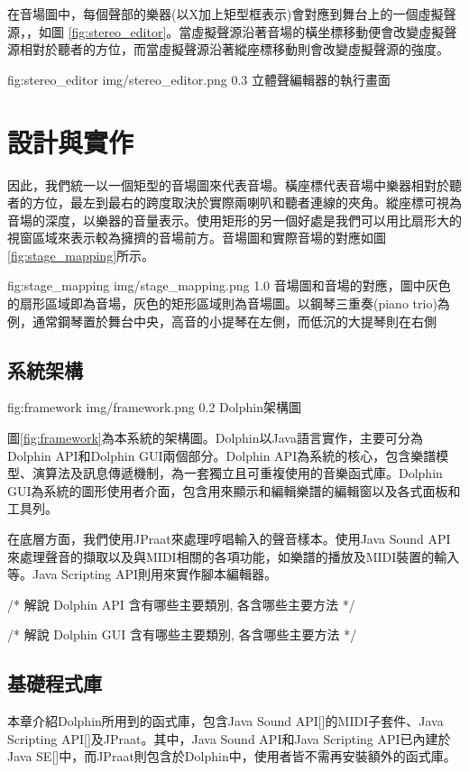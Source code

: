 \documentclass[12pt,a4paper,oneside]{report}
\begin{document}
在音場圖中，每個聲部的樂器(以X加上矩型框表示)會對應到舞台上的一個虛擬聲源，，如圖 \ref{fig:stereo_editor}。當虛擬聲源沿著音場的橫坐標移動便會改變虛擬聲源相對於聽者的方位，而當虛擬聲源沿著縱座標移動則會改變虛擬聲源的強度。

\figurewithcaption
{fig:stereo_editor}
{img/stereo_editor.png}
{0.3}
{立體聲編輯器的執行畫面}

\chapter{設計與實作} 

因此，我們統一以一個矩型的音場圖來代表音場。橫座標代表音場中樂器相對於聽者的方位，最左到最右的跨度取決於實際兩喇叭和聽者連線的夾角。縱座標可視為音場的深度，以樂器的音量表示。使用矩形的另一個好處是我們可以用比扇形大的視窗區域來表示較為擁擠的音場前方。音場圖和實際音場的對應如圖 \ref{fig:stage_mapping}所示。

\figurewithcaption
{fig:stage_mapping}
{img/stage_mapping.png}
{1.0}
{音場圖和音場的對應，圖中灰色的扇形區域即為音場，灰色的矩形區域則為音場圖。以鋼琴三重奏(piano trio)為例，通常鋼琴置於舞台中央，高音的小提琴在左側，而低沉的大提琴則在右側}
\section{系統架構}


\figurewithcaption
{fig:framework}
{img/framework.png}
{0.2}
{Dolphin架構圖}

圖\ref{fig:framework}為本系統的架構圖。Dolphin以Java語言實作，主要可分為Dolphin API和Dolphin GUI兩個部分。Dolphin API為系統的核心，包含樂譜模型、演算法及訊息傳遞機制，為一套獨立且可重複使用的音樂函式庫。Dolphin GUI為系統的圖形使用者介面，包含用來顯示和編輯樂譜的編輯窗以及各式面板和工具列。

在底層方面，我們使用JPraat來處理哼唱輸入的聲音樣本。使用Java Sound API來處理聲音的擷取以及與MIDI相關的各項功能，如樂譜的播放及MIDI裝置的輸入等。Java Scripting API則用來實作腳本編輯器。


/* 
解說 Dolphin API 含有哪些主要類別, 各含哪些主要方法
*/

/* 
解說 Dolphin GUI 含有哪些主要類別, 各含哪些主要方法
*/

\section{基礎程式庫}

本章介紹Dolphin所用到的函式庫，包含Java Sound API[]的MIDI子套件、Java Scripting API[]及JPraat。其中，Java Sound API和Java Scripting API已內建於Java SE[]中，而JPraat則包含於Dolphin中，使用者皆不需再安裝額外的函式庫。
\end{document}
